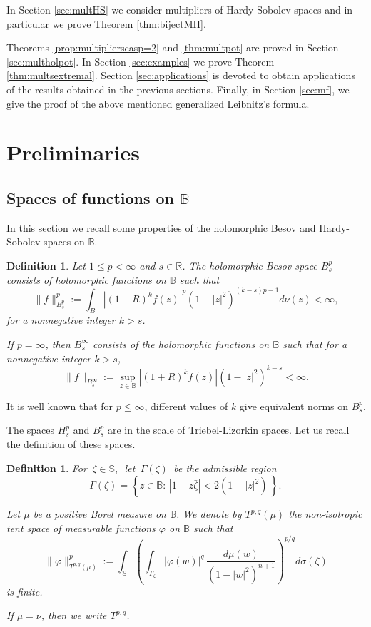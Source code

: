 \documentclass[12pt,twoside,leqno,final]{amsart}
\theoremstyle{plain}
\newtheorem{defn}[thm]{Definition}
\begin{document}
 
 In Section \ref{sec:multHS} we consider multipliers of Hardy-Sobolev spaces and in particular we prove Theorem \ref{thm:bijectMH}.  
 
 Theorems  \ref{prop:multiplierscasp=2} and \ref{thm:multpot} are proved in Section \ref{sec:multholpot}. In Section \ref{sec:examples} we prove Theorem \ref{thm:multsextremal}.
Section \ref{sec:applications} is devoted to obtain  applications of the results obtained in the previous sections. Finally, in Section \ref{sec:mf}, we give the proof of the above mentioned generalized Leibnitz's formula.

\section{Preliminaries}\label{sec:preliminaries}

\subsection{Spaces of functions on ${{\mathbb B}}$}

In this section we recall some properties of the holomorphic Besov and Hardy-Sobolev spaces on ${{\mathbb B}}$.

\begin{defn}
Let $1\le p<\infty$ and $s\in{{\mathbb R}}$. 
The holomorphic Besov space $B^p_s$ consists of holomorphic functions on ${{\mathbb B}}$ such that 
$$
\|f\|_{B^p_s}^p:=\int_B |(1+R)^{k}f(z)|^p(1-|z|^2)^{(k-s)p-1}d\nu(z)<\infty,
$$ 
for a nonnegative integer $k>s$. 

If $p=\infty$, then $B^\infty_s$ consists of the holomorphic functions on ${{\mathbb B}}$ such that for a nonnegative integer $k>s$,
$$
\|f\|_{B^\infty_s}:=\sup_{z\in{{\mathbb B}}}|(1+R)^{k}f(z)|(1-|z|^2)^{k-s}<\infty.
$$ 
\end{defn}

It is well known that for $p\leq \infty$, different values of $k$ give equivalent norms on $B^p_s$.

The spaces $H^p_s$ and $B^p_s$ are in the scale of Triebel-Lizorkin spaces.
Let us recall the definition of these spaces.

\begin{defn}
For $\,{\zeta}\in {{\mathbb S}},\,$ let $\,\Gamma({\zeta})\,$ be
the admissible region
$$ 
\Gamma({\zeta})=\left\{ z \in {{\mathbb B}}:\,|1-z\bar {\zeta} |<2(1-|z|^2)\,\right\}.\,
$$

Let $\mu$ be a positive Borel measure on ${{\mathbb B}}$.
We denote by $T^{p,q}(\mu)$ the non-isotropic tent space of measurable functions $\varphi$ on ${{\mathbb B}}$ such that 
$$
\|\varphi\|_{T^{p,q}(\mu)}^p :=\int_{{\mathbb S}}\left(\int_{\Gamma_{\zeta}}|\varphi(w)|^q\,\frac{d\mu(w)}{(1-|w|^2)^{n+1}}\right)^{p/q} d\sigma({\zeta})
$$
is finite.

If $\mu=\nu$, then we write  $T^{p,q}$.
\end{defn}
\end{document}
